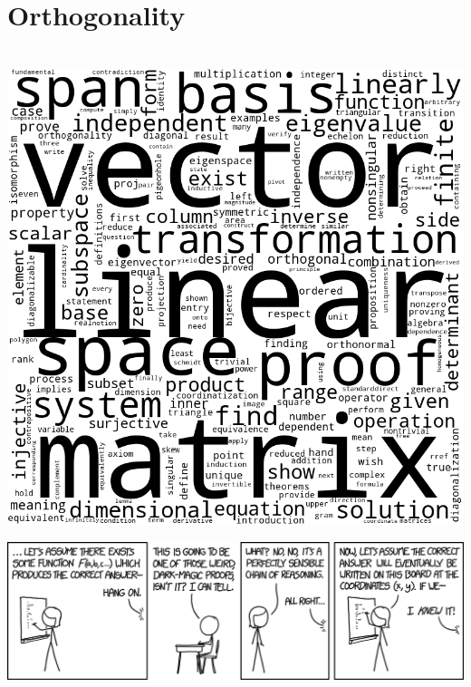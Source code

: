 \documentclass[oneside]{book}
\begin{document}
\chapter{Orthogonality} \label{chapter:ortho}

    

\pagebreak

\chapter*{}

\vspace*{\fill}
\begin{center}
    \includegraphics[scale=0.8]{Graphics/wordcloudlinearalgebra.png}
\end{center}
\vspace*{\fill}

\pagebreak

\appendix
\appendixpage
\noappendicestocpagenum
\addappheadtotoc

\begin{savequote}
    \includegraphics[scale=0.5]{Graphics/proofxkcd.png}
\end{savequote}
\end{document}
